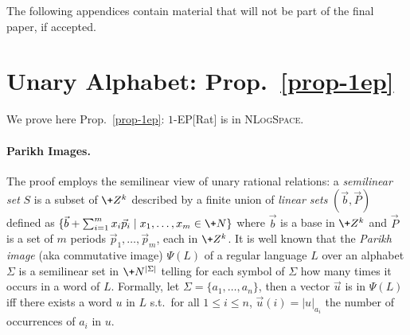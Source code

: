 \def\rightmark{Appendices}
\setcounter{page}{1}\renewcommand{}
\begin{vshort}
\noindent The following appendices contain material that will not be part of the
final paper, if accepted.
\end{vshort}

\section{Unary Alphabet: Prop.~\ref{prop-1ep}}\label{ax-1ep}

We prove here Prop.~\ref{prop-1ep}: $1$-EP[Rat] is in
\textsc{NLogSpace}.

\paragraph{Parikh Images.}  The proof employs the semilinear view of
unary rational relations: a \emph{semilinear set} $S$ is a subset of
$\+Z^k$ described by a finite union of \emph{linear sets}
$(\vec{b},\vec{P})$ defined as $\{\vec{b}+\sum_{i=1}^m
x_i\vec{p}_i\mid x_1,\dots,x_m\in\+N\}$ where $\vec{b}$ is a base in
$\+Z^k$ and $\vec{P}$ is a set of $m$ periods
$\vec{p}_1,\dots,\vec{p}_m$, each in $\+Z^k$.  It is well known that
the \emph{Parikh image} (aka commutative image) $\Psi(L)$ of a regular
language $L$ over an alphabet $\Sigma$ is a semilinear set in
$\+N^{|\Sigma|}$ telling for each symbol of $\Sigma$ how many times it
occurs in a word of $L$.  Formally, let $\Sigma=\{a_1,\dots,a_n\}$,
then a vector $\vec{u}$ is in $\Psi(L)$ iff there exists a word $u$ in
$L$ s.t.\ for all $1\leq i\leq n$, $\vec{u}(i)=|u|_{a_i}$ the number
of occurrences of $a_i$ in $u$.

